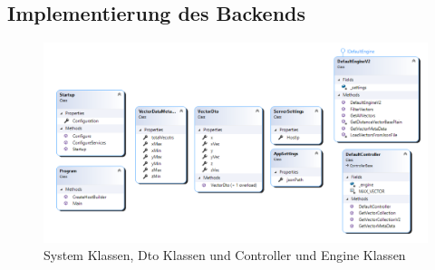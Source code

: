 \subsection{Implementierung des Backends}

\begin{figure}[H]
	\centering
	\includegraphics[width=\linewidth]{images/backend/classDiagram}
	\caption{System Klassen, Dto Klassen und Controller und Engine Klassen}
	\label{fig:ClassDiagram}
\end{figure}

